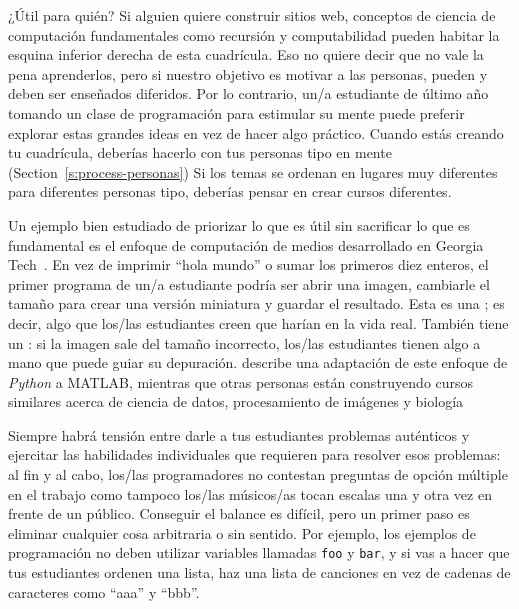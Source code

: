 \begin{aside}{¿Útil para quién?}
  Si alguien quiere construir sitios web,
  conceptos de ciencia de computación fundamentales como recursión y computabilidad
  pueden habitar la esquina inferior derecha de esta cuadrícula. 
  Eso no quiere decir que no vale la pena aprenderlos,
  pero si nuestro objetivo es motivar a las personas,
  pueden y deben ser enseñados diferidos.
  Por lo contrario,
  un/a estudiante de último año tomando un clase de programación para estimular su mente
  puede preferir explorar estas grandes ideas en vez de hacer algo práctico.
  Cuando estás creando tu cuadrícula,
  deberías hacerlo con tus personas tipo en mente
  (Section~\ref{s:process-personas})
  Si los temas se ordenan en lugares muy diferentes para diferentes personas tipo,
  deberías pensar en crear cursos diferentes.
\end{aside}

Un ejemplo bien estudiado de priorizar lo que es útil
sin sacrificar lo que es fundamental
es el enfoque de computación de medios desarrollado en Georgia Tech~\cite{Guzd2013}.
En vez de imprimir ``hola mundo'' o sumar los primeros diez enteros,
el primer programa de un/a estudiante podría ser abrir una imagen,
cambiarle el tamaño para crear una versión miniatura
y guardar el resultado.
Esta es una ; 
es decir, algo que los/las estudiantes creen que harían en la vida real.
También tiene un :
si la imagen sale del tamaño incorrecto,
los/las estudiantes tienen algo a mano que puede guiar su depuración.
\cite{Lee2013} describe una adaptación de este enfoque de \emph{Python} a MATLAB,
mientras que otras personas están construyendo cursos similares acerca de ciencia de datos, procesamiento de imágenes
y biología~\cite{Dahl2018,Meys2018,Ritz2018}

Siempre habrá tensión entre darle a tus estudiantes problemas auténticos
y ejercitar las habilidades individuales que requieren para resolver esos problemas:
al fin y al cabo,
los/las programadores no contestan preguntas de opción múltiple en el trabajo
como tampoco los/las músicos/as tocan escalas una y otra vez en frente de un público.
Conseguir el balance es difícil,
pero un primer paso es eliminar cualquier cosa arbitraria o sin sentido.
Por ejemplo,
los ejemplos de programación no deben utilizar variables llamadas \texttt{foo} y \texttt{bar},
y si vas a hacer que tus estudiantes ordenen una lista,
haz una lista de canciones en vez de cadenas de caracteres como ``aaa'' y ``bbb''.

